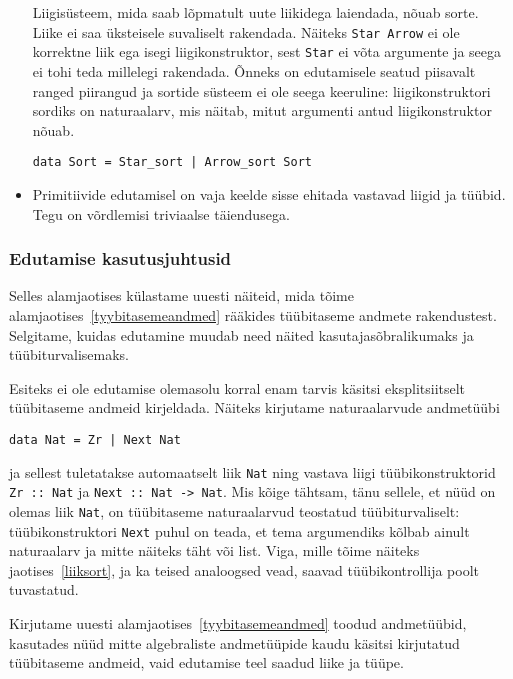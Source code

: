 \documentclass[12pt]{article}
\begin{document}
\begin{itemize}
            Liigisüsteem, mida saab lõpmatult uute liikidega laiendada, nõuab sorte. Liike ei saa üksteisele suvaliselt rakendada. Näiteks \verb!Star Arrow! ei ole korrektne liik ega isegi liigikonstruktor, sest \verb!Star! ei võta argumente ja seega ei tohi teda millelegi rakendada. Õnneks on edutamisele seatud piisavalt ranged piirangud ja sortide süsteem ei ole seega keeruline: liigikonstruktori sordiks on naturaalarv, mis näitab, mitut argumenti antud liigikonstruktor nõuab.

            \begin{verbatim}data Sort = Star_sort | Arrow_sort Sort\end{verbatim}
          \item
            Primitiivide edutamisel on vaja keelde sisse ehitada vastavad liigid ja tüübid. Tegu on võrdlemisi triviaalse täiendusega.
        \end{itemize}
      \subsubsection{Edutamise kasutusjuhtusid}
        Selles alamjaotises külastame uuesti näiteid, mida tõime alamjaotises~\ref{tyybitasemeandmed} rääkides tüübitaseme andmete rakendustest. Selgitame, kuidas edutamine muudab need näited kasutajasõbralikumaks ja tüübiturvalisemaks.

        Esiteks ei ole edutamise olemasolu korral enam tarvis käsitsi eksplitsiitselt tüübitaseme andmeid kirjeldada. Näiteks kirjutame naturaalarvude andmetüübi

        \begin{verbatim}data Nat = Zr | Next Nat\end{verbatim}

        ja sellest tuletatakse automaatselt liik \verb!Nat! ning vastava liigi tüübikonstruktorid \verb!Zr :: Nat! ja \verb!Next :: Nat -> Nat!. Mis kõige tähtsam, tänu sellele, et nüüd on olemas liik \verb!Nat!, on tüübitaseme naturaalarvud teostatud tüübiturvaliselt: tüübikonstruktori \verb!Next! puhul on teada, et tema argumendiks kõlbab ainult naturaalarv ja mitte näiteks täht või list. Viga, mille tõime näiteks jaotises~\ref{liiksort}, ja ka teised analoogsed vead, saavad tüübikontrollija poolt tuvastatud.

        Kirjutame uuesti alamjaotises~\ref{tyybitasemeandmed} toodud andmetüübid, kasutades nüüd mitte algebraliste andmetüüpide kaudu käsitsi kirjutatud tüübitaseme andmeid, vaid edutamise teel saadud liike ja tüüpe.
\end{document}
